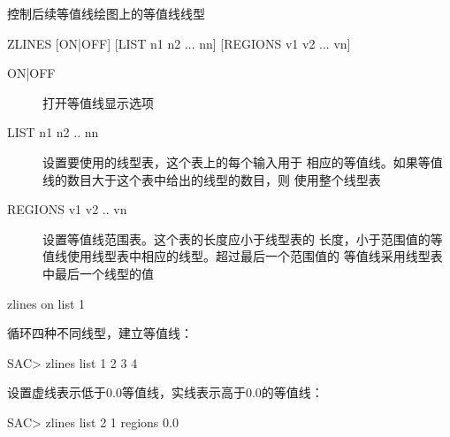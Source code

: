 \label{cmd:zlines}

控制后续等值线绘图上的等值线线型

\begin{SACSTX}
ZLINES  [ON|OFF] [LIST n1 n2 ... nn] [REGIONS v1 v2 ... vn]
\end{SACSTX}

\begin{description}
\item [ON|OFF] 打开等值线显示选项
\item [LIST n1 n2 .. nn] 设置要使用的线型表，这个表上的每个输入用于
    相应的等值线。如果等值线的数目大于这个表中给出的线型的数目，则
    使用整个线型表
\item [REGIONS v1 v2 .. vn] 设置等值线范围表。这个表的长度应小于线型表的
    长度，小于范围值的等值线使用线型表中相应的线型。超过最后一个范围值的
    等值线采用线型表中最后一个线型的值
\end{description}

\begin{SACDFT}
zlines on list 1
\end{SACDFT}

循环四种不同线型，建立等值线：
\begin{SACCode}
SAC> zlines list 1 2 3 4
\end{SACCode}

设置虚线表示低于0.0等值线，实线表示高于0.0的等值线：
\begin{SACCode}
SAC> zlines list 2 1 regions 0.0
\end{SACCode}
